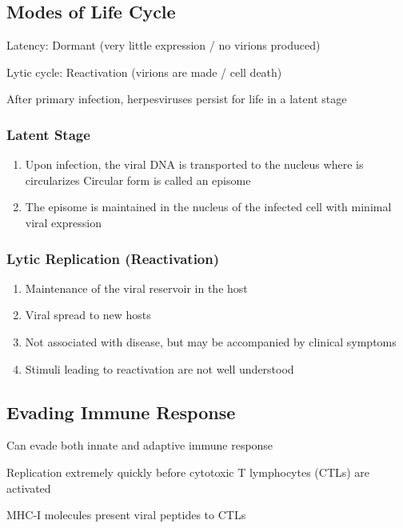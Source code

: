 \documentclass{notes}
\begin{document}
\subsection{Modes of Life Cycle}

Latency: Dormant (very little expression / no virions produced)

Lytic cycle: Reactivation (virions are made / cell death)

After primary infection, herpesviruses persist for life in a latent stage

\subsubsection{Latent Stage}

\begin{enumerate}
    \item Upon infection, the viral DNA is transported to the nucleus where is circularizes
    \subitem Circular form is called an episome
    \item The episome is maintained in the nucleus of the infected cell with minimal viral expression
\end{enumerate}

\subsubsection{Lytic Replication (Reactivation)}

\begin{enumerate}
    \item Maintenance of the viral reservoir in the host
    \item Viral spread to new hosts
    \item Not associated with disease, but may be accompanied by clinical symptoms
    \item Stimuli leading to reactivation are not well understood
\end{enumerate}

\subsection{Evading Immune Response}

Can evade both innate and adaptive immune response

\tab Replication extremely quickly before cytotoxic T lymphocytes (CTLs) are activated

MHC-I molecules present viral peptides to CTLs
\end{document}
